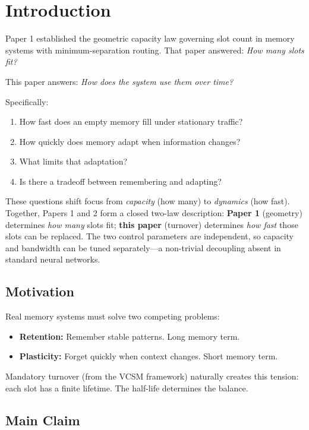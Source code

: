 \documentclass[11pt]{article}
\begin{document}
\section{Introduction}

Paper 1 \cite{aubin2026capacity} established the geometric capacity law governing slot count in memory systems with minimum-separation routing. That paper answered: \textit{How many slots fit?}

This paper answers: \textit{How does the system use them over time?}

Specifically:
\begin{enumerate}
  \item How fast does an empty memory fill under stationary traffic?
  \item How quickly does memory adapt when information changes?
  \item What limits that adaptation?
  \item Is there a tradeoff between remembering and adapting?
\end{enumerate}

These questions shift focus from \textit{capacity} (how many) to \textit{dynamics} (how fast).
Together, Papers 1 and 2 form a closed two-law description:
\textbf{Paper 1} (geometry) determines \emph{how many} slots fit;
\textbf{this paper} (turnover) determines \emph{how fast} those slots can be replaced.
The two control parameters are independent, so capacity and bandwidth can be tuned separately---a
non-trivial decoupling absent in standard neural networks.

\subsection{Motivation}

Real memory systems must solve two competing problems:
\begin{itemize}
  \item \textbf{Retention:} Remember stable patterns. Long memory term.
  \item \textbf{Plasticity:} Forget quickly when context changes. Short memory term.
\end{itemize}

Mandatory turnover (from the VCSM framework) naturally creates this tension:
each slot has a finite lifetime. The half-life determines the balance.

\subsection{Main Claim}
\end{document}
